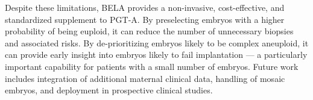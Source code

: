 \documentclass[10pt]{article}
\begin{document}
Despite these limitations, BELA provides a non-invasive, cost-effective, and
standardized supplement to PGT-A. By preselecting embryos with a higher
probability of being euploid, it can reduce the number of unnecessary
biopsies and associated risks. By de-prioritizing embryos likely to be
complex aneuploid, it can provide early insight into embryos likely to fail
implantation --- a particularly important capability for patients with a
small number of embryos. Future work includes integration of additional
maternal clinical data, handling of mosaic embryos, and deployment in
prospective clinical studies.



\end{document}
